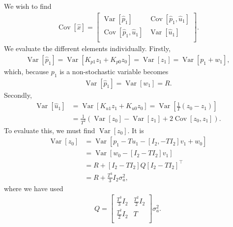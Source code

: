 \documentclass[]{article}
\DeclareMathOperator{\Var}{\text{Var}}
\DeclareMathOperator{\Cov}{\text{Cov}}
\begin{document}
\subsection{}
We wish to find
\begin{equation}\begin{aligned}
\Cov[\hat x] =
\begin{bmatrix}
\Var[\hat p_1] & \Cov[\hat p_1, \hat u_1] \\
\Cov[\hat p_1, \hat u_1] & \Var[\hat u_1] \\
\end{bmatrix}.
\end{aligned}\end{equation}
We evaluate the different elements individually. Firstly,
\begin{equation}\begin{aligned}
\label{eq:var_z1}
\Var[\hat p_1] = \Var[K_{p1}z_1 + K_{p0}z_0] = \Var[z_1] = \Var[p_1 + w_1],
\end{aligned}\end{equation}
which, because $p_1$ is a non-stochastic variable becomes
\begin{equation}\begin{aligned}
\Var[\hat p_1] = \Var[w_1] = R.
\end{aligned}\end{equation}
Secondly,
\begin{equation}\begin{aligned}
\Var[\hat u_1] &= \Var[K_{u1} z_1 + K_{u0} z_0] = \Var[\frac{1}{T}(z_0 - z_1 )] \\
&= \frac{1}{T^2}(\Var[z_0] - \Var[z_1] + 2 \Cov[z_0, z_1]).
\end{aligned}\end{equation}
To evaluate this, we must find $\Var[z_0]$. It is
\begin{equation}\begin{aligned}
\Var[z_0] &= \Var[p_1 - Tu_1 - [I_2, -TI_2]v_1 + w_0] \\
&= \Var[w_0 - [I_2 - TI_2] v_1] \\
&= R + [I_2 - TI_2] Q [I_2 - TI_2]^\top \\
&= R + \frac{T^3}{3}I_2 \sigma_a^2,
\end{aligned}\end{equation}
where we have used
\begin{equation}\begin{aligned}
Q =
\begin{bmatrix}
\frac{T^3}{3} I_2 & \frac{T^2}{2} I_2 \\
\frac{T^2}{2} I_2 & T \\
\end{bmatrix}\sigma_a^2.
\end{aligned}\end{equation}
\end{document}
